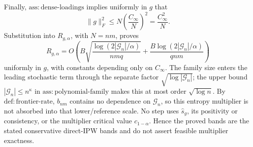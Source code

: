 Finally, \(\mathrm{ass:dense\mbox{-}loadings}\) implies uniformly in \(g\) that
\[
 \lVert g\rVert_F^2
 \le N\left(\frac{C_\infty}{N}\right)^2
 =\frac{C_\infty^2}{N}.
\]
Substitution into \(R_{g,\alpha}\), with \(N=nm\), proves
\[
 R_{g,\alpha}
 =O\!\left(
 B\sqrt{\frac{\log(2|\mathcal G_n|/\alpha)}{nmq}}
 +\frac{B\log(2|\mathcal G_n|/\alpha)}{qnm}
 \right)
\]
uniformly in \(g\), with constants depending only on \(C_\infty\).  The family size enters the leading stochastic term through the separate factor \(\sqrt{\log|\mathcal G_n|}\); the upper bound \(|\mathcal G_n|\le n^\kappa\) in \(\mathrm{ass:polynomial\mbox{-}family}\) makes this at most order \(\sqrt{\log n}\).  By \(\mathrm{def:frontier\mbox{-}rate}\), \(b_{nm}\) contains no dependence on \(\mathcal G_n\), so this entropy multiplier is not absorbed into that lower/reference scale.  No step uses \(\widehat s_g\), its positivity or consistency, or the multiplier critical value \(c_{1-\alpha}\).  Hence the proved bands are the stated conservative direct-IPW bands and do not assert feasible multiplier exactness.
